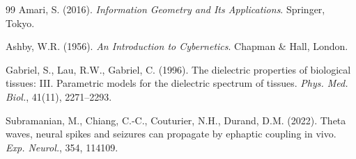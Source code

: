 \documentclass[12pt]{article}
\begin{document}
\begin{thebibliography}{99}
Amari, S. (2016). \textit{Information Geometry and Its Applications}. Springer, Tokyo.

Ashby, W.R. (1956). \textit{An Introduction to Cybernetics}. Chapman \& Hall, London.

Gabriel, S., Lau, R.W., Gabriel, C. (1996). The dielectric properties of biological tissues: III. Parametric models for the dielectric spectrum of tissues. \textit{Phys. Med. Biol.}, 41(11), 2271--2293.

Subramanian, M., Chiang, C.-C., Couturier, N.H., Durand, D.M. (2022). Theta waves, neural spikes and seizures can propagate by ephaptic coupling in vivo. \textit{Exp. Neurol.}, 354, 114109.

\end{thebibliography}
\end{document}
